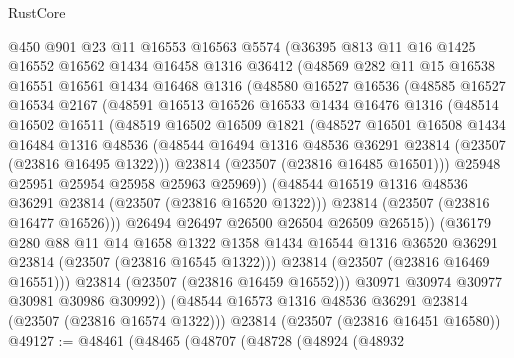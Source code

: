 \begin{lexlean}{RustCore}
\begin{coremodule}
        @450
        @901
        @23
        @11
        @16553
        @16563
        @5574
        (@36395
          @813
          @11
          @16
          @1425
          @16552
          @16562
          @1434
          @16458
          @1316
          @36412
          (@48569
            @282
            @11
            @15
            @16538
            @16551
            @16561
            @1434
            @16468
            @1316
            (@48580
              @16527
              @16536
              (@48585
                @16527
                @16534
                @2167
                (@48591
                  @16513
                  @16526
                  @16533
                  @1434
                  @16476
                  @1316
                  (@48514
                    @16502
                    @16511
                    (@48519
                      @16502
                      @16509
                      @1821
                      (@48527
                        @16501
                        @16508
                        @1434
                        @16484
                        @1316
                        @48536
                        (@48544 @16494 @1316 @48536 @36291 @23814 (@23507 (@23816 @16495 @1322)))
                        @23814
                        (@23507 (@23816 @16485 @16501)))
                      @25948
                      @25951
                      @25954
                      @25958
                      @25963
                      @25969))
                  (@48544 @16519 @1316 @48536 @36291 @23814 (@23507 (@23816 @16520 @1322)))
                  @23814
                  (@23507 (@23816 @16477 @16526)))
                @26494
                @26497
                @26500
                @26504
                @26509
                @26515))
            (@36179
              @280
              @88
              @11
              @14
              @1658
              @1322
              @1358
              @1434
              @16544
              @1316
              @36520
              @36291
              @23814
              (@23507 (@23816 @16545 @1322)))
            @23814
            (@23507 (@23816 @16469 @16551)))
          @23814
          (@23507 (@23816 @16459 @16552)))
        @30971
        @30974
        @30977
        @30981
        @30986
        @30992))
    (@48544 @16573 @1316 @48536 @36291 @23814 (@23507 (@23816 @16574 @1322)))
    @23814
    (@23507 (@23816 @16451 @16580))
@49127 := @48461
    (@48465
      (@48707
        (@48728
          (@48924
            (@48932

\end{coremodule}
\end{lexlean}
